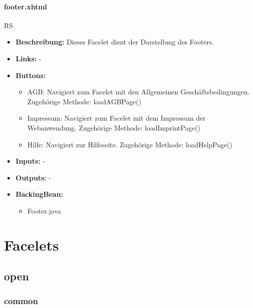 		\paragraph{footer.xhtml}
			RS\\
			\begin{itemize}
				\item \textbf{Beschreibung:} Dieses Facelet dient der Darstellung des Footers.
				\item \textbf{Links:} -
				\item \textbf{Buttons:}
					\begin{itemize}
						\item AGB: Navigiert zum Facelet mit den Allgemeinen Geschäftsbedingungen. Zugehörige Methode: loadAGBPage()
						\item Impressum: Navigiert zum Facelet mit dem Impressum der Webanwendung. Zugehörige Methode: loadImprintPage()
						\item Hilfe: Navigiert zur Hilfeseite. Zugehörige Methode: loadHelpPage()
					\end{itemize}
				\item \textbf{Inputs:} -
				\item \textbf{Outputs:} -
				\item \textbf{BackingBean:}
					\begin{itemize}
						\item Footer.java
					\end{itemize}
			\end{itemize}
	
	\section{Facelets}
	
		\subsection{open}
			
			\subsubsection{common}
			
